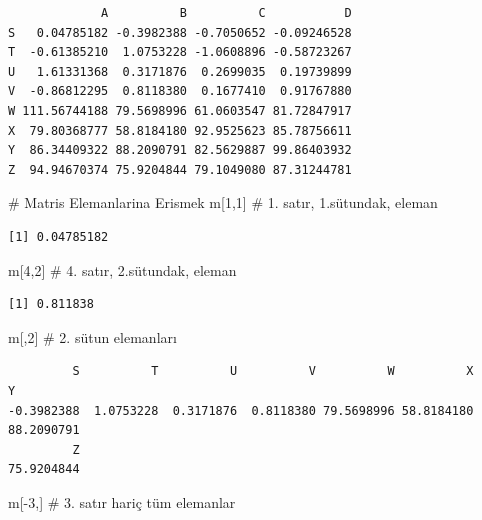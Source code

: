 \documentclass[
  letterpaper,
  DIV=11,
  numbers=noendperiod]{scrreprt}
\newenvironment{Shaded}{\begin{snugshade}}{\end{snugshade}}
\newcommand{\CommentTok}[1]{\textcolor[rgb]{0.37,0.37,0.37}{#1}}
\newcommand{\DecValTok}[1]{\textcolor[rgb]{0.68,0.00,0.00}{#1}}
\newcommand{\NormalTok}[1]{\textcolor[rgb]{0.00,0.23,0.31}{#1}}
\newcommand{\SpecialCharTok}[1]{\textcolor[rgb]{0.37,0.37,0.37}{#1}}
\begin{document}
\begin{verbatim}
             A          B          C           D
S   0.04785182 -0.3982388 -0.7050652 -0.09246528
T  -0.61385210  1.0753228 -1.0608896 -0.58723267
U   1.61331368  0.3171876  0.2699035  0.19739899
V  -0.86812295  0.8118380  0.1677410  0.91767880
W 111.56744188 79.5698996 61.0603547 81.72847917
X  79.80368777 58.8184180 92.9525623 85.78756611
Y  86.34409322 88.2090791 82.5629887 99.86403932
Z  94.94670374 75.9204844 79.1049080 87.31244781
\end{verbatim}

\begin{Shaded}
\begin{Highlighting}[]
\CommentTok{\# Matris Elemanlarina Erismek}
\NormalTok{m[}\DecValTok{1}\NormalTok{,}\DecValTok{1}\NormalTok{] }\CommentTok{\# 1. satır, 1.sütundak, eleman}
\end{Highlighting}
\end{Shaded}

\begin{verbatim}
[1] 0.04785182
\end{verbatim}

\begin{Shaded}
\begin{Highlighting}[]
\NormalTok{m[}\DecValTok{4}\NormalTok{,}\DecValTok{2}\NormalTok{] }\CommentTok{\# 4. satır, 2.sütundak, eleman}
\end{Highlighting}
\end{Shaded}

\begin{verbatim}
[1] 0.811838
\end{verbatim}

\begin{Shaded}
\begin{Highlighting}[]
\NormalTok{m[,}\DecValTok{2}\NormalTok{] }\CommentTok{\# 2. sütun elemanları}
\end{Highlighting}
\end{Shaded}

\begin{verbatim}
         S          T          U          V          W          X          Y 
-0.3982388  1.0753228  0.3171876  0.8118380 79.5698996 58.8184180 88.2090791 
         Z 
75.9204844 
\end{verbatim}

\begin{Shaded}
\begin{Highlighting}[]
\NormalTok{m[}\SpecialCharTok{{-}}\DecValTok{3}\NormalTok{,] }\CommentTok{\# 3. satır hariç tüm elemanlar}
\end{Highlighting}
\end{Shaded}
\end{document}
